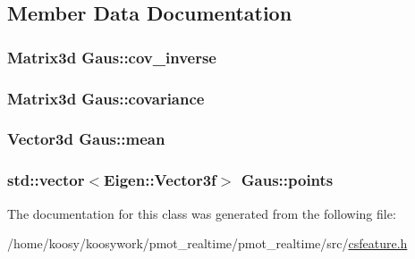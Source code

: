 \subsection{\-Member \-Data \-Documentation}
\hypertarget{class_gaus_a7f25ee8f8347d0f35d6ea1c395b457ef}{
\subsubsection[{cov\-\_\-inverse}]{\setlength{\rightskip}{0pt plus 5cm}\-Matrix3d {\bf \-Gaus\-::cov\-\_\-inverse}}}\label{class_gaus_a7f25ee8f8347d0f35d6ea1c395b457ef}
\hypertarget{class_gaus_a9cfd18796f63e6816b79ab0305ca922e}{
\subsubsection[{covariance}]{\setlength{\rightskip}{0pt plus 5cm}\-Matrix3d {\bf \-Gaus\-::covariance}}}\label{class_gaus_a9cfd18796f63e6816b79ab0305ca922e}
\hypertarget{class_gaus_a6704c416a9e7c8a8555be8a4c4212242}{
\subsubsection[{mean}]{\setlength{\rightskip}{0pt plus 5cm}\-Vector3d {\bf \-Gaus\-::mean}}}\label{class_gaus_a6704c416a9e7c8a8555be8a4c4212242}
\hypertarget{class_gaus_aeadf1a4aa0690cf976d7954f51dda832}{
\subsubsection[{points}]{\setlength{\rightskip}{0pt plus 5cm}std\-::vector$<$\-Eigen\-::\-Vector3f$>$ {\bf \-Gaus\-::points}}}\label{class_gaus_aeadf1a4aa0690cf976d7954f51dda832}


\-The documentation for this class was generated from the following file\-:\begin{DoxyCompactItemize}
\item 
/home/koosy/koosywork/pmot\-\_\-realtime/pmot\-\_\-realtime/src/\hyperlink{csfeature_8h}{csfeature.\-h}\end{DoxyCompactItemize}
